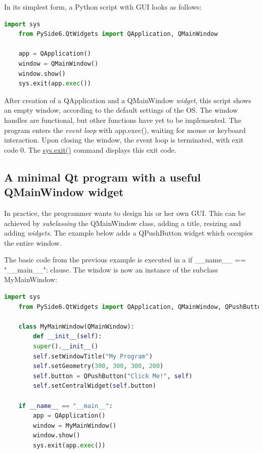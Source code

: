 In its simplest form, a Python script with GUI looks as follows:
\begin{lstlisting}[language=Python, numbers=none, aboveskip=\smallskipamount]
	import sys
	from PySide6.QtWidgets import QApplication, QMainWindow
	
	app = QApplication()
	window = QMainWindow()
	window.show()
	sys.exit(app.exec())
\end{lstlisting}
After creation of a QApplication and a QMainWindow \emph{widget}, this script shows an empty window, according to the default settings of the OS. The window handles are functional, but other functions have yet to be implemented. The program enters the \emph{event loop} with \textsf{app.exec()}, waiting for mouse or keyboard interaction. Upon closing the window, the event loop is terminated, with exit code \textsf{0}. The 
\href{https://superfastpython.com/exit-process/#What_is_sysexit}{\textsf{sys.exit()}} command displays this exit code.

\subsection{A minimal Qt program with a useful QMainWindow widget}

In practice, the programmer wants to design his or her own GUI. This can be achieved by \emph{subclassing} the QMainWindow class, adding a title, resizing and adding \emph{widgets}. The example below adds a QPushButton widget which occupies the entire window.

The basic code from the previous example is executed in a \textsf{if \_\_name\_\_ == "\_\_main\_\_":} clause. The window is now an instance of the subclass \textsf{MyMainWindow}:

\begin{lstlisting}[language=Python, numbers=none, aboveskip=\smallskipamount]
    import sys
    from PySide6.QtWidgets import QApplication, QMainWindow, QPushButton

    class MyMainWindow(QMainWindow):
        def __init__(self):
        super().__init__()
        self.setWindowTitle("My Program")
        self.setGeometry(300, 300, 300, 200)
        self.button = QPushButton("Click Me!", self)
        self.setCentralWidget(self.button)

    if __name__ == "__main__":
        app = QApplication()
        window = MyMainWindow()
        window.show()
        sys.exit(app.exec())
\end{lstlisting}


